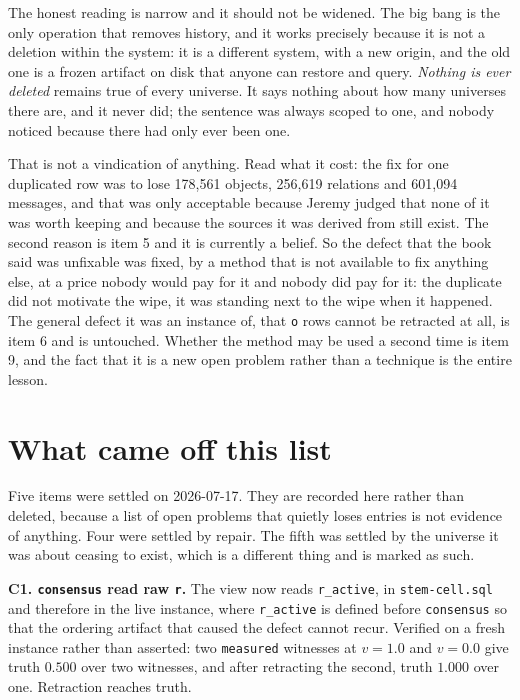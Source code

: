 The honest reading is narrow and it should not be widened. The big bang is the only operation that removes history, and it works precisely because it is not a deletion within the system: it is a different system, with a new origin, and the old one is a frozen artifact on disk that anyone can restore and query. \textit{Nothing is ever deleted} remains true of every universe. It says nothing about how many universes there are, and it never did; the sentence was always scoped to one, and nobody noticed because there had only ever been one.

That is not a vindication of anything. Read what it cost: the fix for one duplicated row was to lose 178,561 objects, 256,619 relations and 601,094 messages, and that was only acceptable because Jeremy judged that none of it was worth keeping and because the sources it was derived from still exist. The second reason is item 5 and it is currently a belief. So the defect that the book said was unfixable was fixed, by a method that is not available to fix anything else, at a price nobody would pay for it and nobody did pay for it: the duplicate did not motivate the wipe, it was standing next to the wipe when it happened. The general defect it was an instance of, that \texttt{o} rows cannot be retracted at all, is item 6 and is untouched. Whether the method may be used a second time is item 9, and the fact that it is a new open problem rather than a technique is the entire lesson.

\section{What came off this list}

Five items were settled on 2026-07-17. They are recorded here rather than deleted, because a list of open problems that quietly loses entries is not evidence of anything. Four were settled by repair. The fifth was settled by the universe it was about ceasing to exist, which is a different thing and is marked as such.

\textbf{C1. \texttt{consensus} read raw \texttt{r}.} The view now reads \texttt{r\_active}, in \texttt{stem-cell.sql} and therefore in the live instance, where \texttt{r\_active} is defined before \texttt{consensus} so that the ordering artifact that caused the defect cannot recur. Verified on a fresh instance rather than asserted: two \texttt{measured} witnesses at $v=1.0$ and $v=0.0$ give truth $0.500$ over two witnesses, and after retracting the second, truth $1.000$ over one. Retraction reaches truth.

